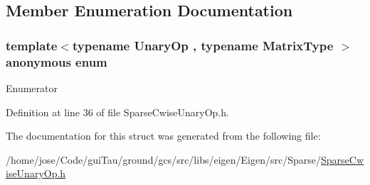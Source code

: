 \subsection{Member Enumeration Documentation}
\hypertarget{structei__traits_3_01_sparse_cwise_unary_op_3_01_unary_op_00_01_matrix_type_01_4_01_4_a8919cb551eff0214dee068e4dd16b93d}{\subsubsection[{anonymous enum}]{\setlength{\rightskip}{0pt plus 5cm}template$<$typename Unary\-Op , typename Matrix\-Type $>$ anonymous enum}}\label{structei__traits_3_01_sparse_cwise_unary_op_3_01_unary_op_00_01_matrix_type_01_4_01_4_a8919cb551eff0214dee068e4dd16b93d}
\begin{Desc}
\item[Enumerator]\par
\begin{description}
\item[{\em 
\hypertarget{structei__traits_3_01_sparse_cwise_unary_op_3_01_unary_op_00_01_matrix_type_01_4_01_4_a8919cb551eff0214dee068e4dd16b93da5974c6862e5314846fc62d71ae309c53}{Coeff\-Read\-Cost}\label{structei__traits_3_01_sparse_cwise_unary_op_3_01_unary_op_00_01_matrix_type_01_4_01_4_a8919cb551eff0214dee068e4dd16b93da5974c6862e5314846fc62d71ae309c53}
}]\end{description}
\end{Desc}


Definition at line 36 of file Sparse\-Cwise\-Unary\-Op.\-h.



The documentation for this struct was generated from the following file\-:\begin{DoxyCompactItemize}
\item 
/home/jose/\-Code/gui\-Tau/ground/gcs/src/libs/eigen/\-Eigen/src/\-Sparse/\hyperlink{_sparse_cwise_unary_op_8h}{Sparse\-Cwise\-Unary\-Op.\-h}\end{DoxyCompactItemize}

